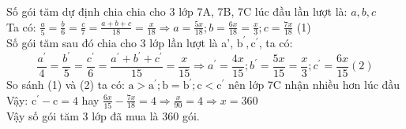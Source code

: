 \begin{bt}
{\begin{enumerate}
			Số gói tăm dự định chia chia cho 3 lớp 7A, 7B, 7C lúc đầu lần lượt là: $a, b, c$\\[5px]
			Ta có: $\frac{a}{5}=\frac{b}{6}=\frac{c}{7}=\frac{a+b+c}{18}=\frac{x}{18} \Rightarrow a=\frac{5 x}{18} ; b=\frac{6 x}{18}=\frac{x}{3} ; c=\frac{7 x}{18}$ (1)\\[5px]
			Số gói tăm sau đó chia cho 3 lớp lần lượt là a', $\mathrm{b}^{\prime}, \mathrm{c}^{\prime}$, ta có:
			$$
			\frac{a^{\prime}}{4}=\frac{b^{\prime}}{5}=\frac{c^{\prime}}{6}=\frac{a^{\prime}+b^{\prime}+c^{\prime}}{15}=\frac{x}{15} \Rightarrow a^{\prime}=\frac{4 x}{15} ; b^{\prime}=\frac{5 x}{15}=\frac{x}{3} ; c^{\prime}=\frac{6 x}{15} (2)
			$$
			So sánh (1) và (2) ta có: $\mathrm{a}>\mathrm{a}^{\prime} ; \mathrm{b}=\mathrm{b}^{\prime} ; \mathrm{c}<\mathrm{c}^{\prime}$ nên lớp 7C nhận nhiều hơn lúc đầu\\[5px]
			 Vậy: $\mathrm{c}^{\prime}-\mathrm{c}=4$ hay $\frac{6 x}{15}-\frac{7 x}{18}=4 \Rightarrow \frac{x}{90}=4 \Rightarrow x=360$\\[5px]
			Vậy số gói tăm 3 lớp đã mua là 360 gói.
		\end{enumerate}
	} 
\end{bt}

